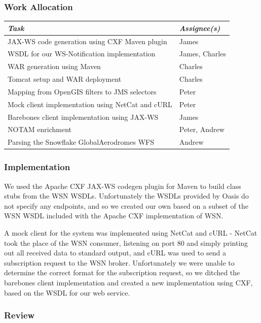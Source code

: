 \documentclass[a4paper, 12pt]{article}
\begin{document}
\subsubsection{Work Allocation}

\begin{tabular}{l|l}
  \emph{Task} & \emph{Assignee(s)} \\ \hline
  JAX-WS code generation using CXF Maven plugin & James \\
  WSDL for our WS-Notification implementation & James, Charles \\
  WAR generation using Maven & Charles \\
  Tomcat setup and WAR deployment & Charles \\
  Mapping from OpenGIS filters to JMS selectors & Peter \\
  Mock client implementation using NetCat and cURL & Peter \\
  Barebones client implementation using JAX-WS & James \\
  NOTAM enrichment & Peter, Andrew \\
  Parsing the Snowflake GlobalAerodromes WFS & Andrew \\
\end{tabular}

\subsubsection{Implementation}

We used the Apache CXF JAX-WS codegen plugin for Maven to build class stubs from the WSN WSDLs. Unfortunately the WSDLs provided by Oasis do not specify any endpoints, and so we created our own based on a subset of the WSN WSDL included with the Apache CXF implementation of WSN.

A mock client for the system was implemented using NetCat and cURL - NetCat took the place of the WSN consumer, listening on port 80 and simply printing out all received data to standard output, and cURL was used to send a subscription request to the WSN broker. Unfortunately we were unable to determine the correct format for the subscription request, so we ditched the barebones client implementation and created a new implementation using CXF, based on the WSDL for our web service.

\subsubsection{Review}
\end{document}
